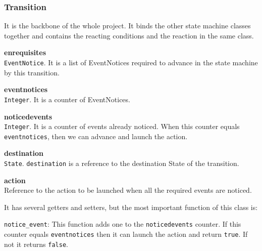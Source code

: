 \subsubsection{Transition}
It is the backbone of the whole project. It binds the other state machine classes together and contains the reacting conditions and the
reaction in the same class.\\
\begin{list}{-}{The attributes are:}
  \item {\bf enrequisites}\\
    \texttt{EventNotice}. It is a list of EventNotices required to advance in the state machine by this transition.
  \item {\bf eventnotices}\\
    \texttt{Integer}. It is a counter of EventNotices.
  \item {\bf noticedevents}\\
    \texttt{Integer}. It is a counter of events already noticed. When this counter equals \texttt{eventnotices}, then we can advance and 
    launch the action.
  \item {\bf destination}\\
    \texttt{State}. \texttt{destination} is a reference to the destination State of the transition.
  \item {\bf action}\\
    Reference to the action to be launched when all the required events are noticed.
\end{list}
It has several getters and setters, but the most important function of this class is:
\begin{list}{}{}
  \item \texttt{notice\_event}:
    This function adds one to the \texttt{noticedevents} counter. If this counter equals \texttt{eventnotices} then it can launch the
    action and return \texttt{true}. If not it returns \texttt{false}.
\end{list}
